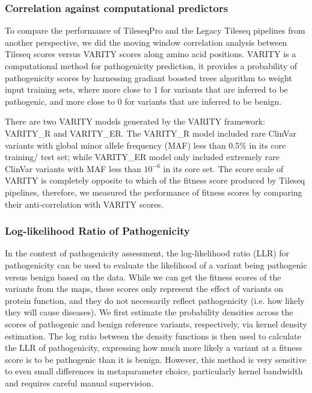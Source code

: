 \documentclass{article}
\begin{document}
\subsubsection{Correlation against computational predictors}
To compare the performance of TileseqPro and the Legacy Tileseq pipelines from another perspective, we did the moving window correlation analysis between Tileseq scores versus VARITY\cite{wu_improved_2021} scores along amino acid positions. VARITY is a computational method for pathogenicity prediction, it provides a probability of pathogenicity scores by harnessing gradiant boosted trees algorithm to weight input training sets, where more close to 1 for variants that are inferred to be pathogenic, and more close to 0 for variants that are inferred to be benign. 

There are two VARITY models generated by the VARITY framework: VARITY\_R and VARITY\_ER. The VARITY\_R model included rare ClinVar\cite{10.1093/nar/gkx1153} variants with global minor allele frequency (MAF) less than 0.5\% in its core training/ test set; while VARITY\_ER model only included extremely rare ClinVar variants with MAF less than ${10}^{-6}$ in its core set. The score scale of VARITY is completely opposite to which of the fitness score produced by Tileseq pipelines, therefore, we measured the performance of fitness scores by comparing their anti-correlation with VARITY scores.


\subsubsection{Log-likelihood Ratio of Pathogenicity}

In the context of pathogenicity assessment, the log-likelihood ratio (LLR) for pathogenicity\cite{weile_shifting_2021} can be used to evaluate the likelihood of a variant being pathogenic versus benign based on the data. While we can get the fitness scores of the variants from the maps, these scores only represent the effect of variants on protein function, and they do not necessarily reflect pathogenicity (i.e. how likely they will cause diseases)\cite{floyd_proactive_2023}. We first estimate the probability densities across the scores of pathogenic and benign reference variants, respectively, via kernel density estimation. The log ratio between the density functions is then used to calculate the LLR of pathogenicity, expressing how much more likely a variant at a fitness score is to be pathogenic than it is benign\cite{floyd_proactive_2023}. However, this method is very sensitive to even small differences in metaparameter choice, particularly kernel bandwidth and requires careful manual supervision.
\end{document}
